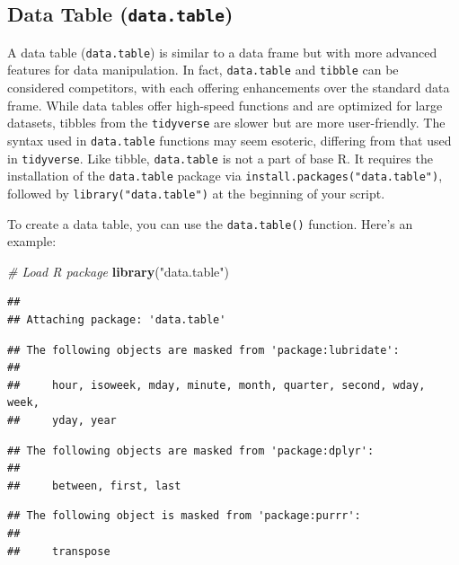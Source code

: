 \documentclass[
]{book}
\newenvironment{Shaded}{\begin{snugshade}}{\end{snugshade}}
\newcommand{\CommentTok}[1]{\textcolor[rgb]{0.56,0.35,0.01}{\textit{#1}}}
\newcommand{\FunctionTok}[1]{\textcolor[rgb]{0.13,0.29,0.53}{\textbf{#1}}}
\newcommand{\NormalTok}[1]{#1}
\newcommand{\StringTok}[1]{\textcolor[rgb]{0.31,0.60,0.02}{#1}}
\begin{document}
\hypertarget{data-table-data.table}{%
\subsection{\texorpdfstring{Data Table (\texttt{data.table})}{Data Table (data.table)}}\label{data-table-data.table}}

A data table (\texttt{data.table}) is similar to a data frame but with more advanced features for data manipulation. In fact, \texttt{data.table} and \texttt{tibble} can be considered competitors, with each offering enhancements over the standard data frame. While data tables offer high-speed functions and are optimized for large datasets, tibbles from the \texttt{tidyverse} are slower but are more user-friendly. The syntax used in \texttt{data.table} functions may seem esoteric, differing from that used in \texttt{tidyverse}. Like tibble, \texttt{data.table} is not a part of base R. It requires the installation of the \texttt{data.table} package via \texttt{install.packages("data.table")}, followed by \texttt{library("data.table")} at the beginning of your script.

To create a data table, you can use the \texttt{data.table()} function. Here's an example:

\begin{Shaded}
\begin{Highlighting}[]
\CommentTok{\# Load R package}
\FunctionTok{library}\NormalTok{(}\StringTok{"data.table"}\NormalTok{)}
\end{Highlighting}
\end{Shaded}

\begin{verbatim}
## 
## Attaching package: 'data.table'
\end{verbatim}

\begin{verbatim}
## The following objects are masked from 'package:lubridate':
## 
##     hour, isoweek, mday, minute, month, quarter, second, wday, week,
##     yday, year
\end{verbatim}

\begin{verbatim}
## The following objects are masked from 'package:dplyr':
## 
##     between, first, last
\end{verbatim}

\begin{verbatim}
## The following object is masked from 'package:purrr':
## 
##     transpose
\end{verbatim}
\end{document}
